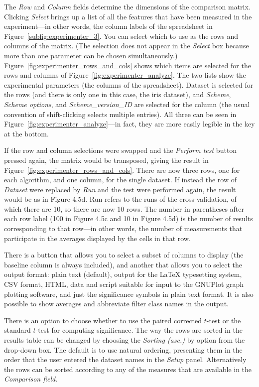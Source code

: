 The \textit{Row} and \textit{Column} fields determine the dimensions
of the comparison matrix. Clicking \textit{Select} brings up a list of
all the features that have been measured in the experiment---in other
words, the column labels of the spreadsheet in
Figure~\ref{subfig:experimenter_3}. You can select which to use as the
rows and columns of the matrix. (The selection does not appear in the
\textit{Select} box because more than one parameter can be chosen
simultaneously.) Figure~\ref{fig:experimenter_rows_and_cols} shows
which items are selected for the rows and columns of
Figure~\ref{fig:experimenter_analyze}. The two lists show the
experimental parameters (the columns of the spreadsheet). Dataset is
selected for the rows (and there is only one in this case, the iris
dataset), and \textit{Scheme}, \textit{Scheme options}, and
\textit{Scheme\_version\_ID} are selected for the column (the usual
convention of shift-clicking selects multiple entries). All three can
be seen in Figure~\ref{fig:experimenter_analyze}---in fact, they are
more easily legible in the key at the bottom.

If the row and column selections were swapped and the \textit{Perform
  test} button pressed again, the matrix would be transposed, giving
the result in Figure~\ref{fig:experimenter_rows_and_cols}. There
are now three rows, one for each algorithm, and one column, for the
single dataset. If instead the row of \textit{Dataset} were replaced
by \textit{Run} and the test were performed again, the result would be
as in Figure 4.5d. Run refers to the runs of the cross-validation, of
which there are 10, so there are now 10 rows. The number in
parentheses after each row label (100 in Figure 4.5c and 10 in Figure
4.5d) is the number of results corresponding to that row---in other
words, the number of measurements that participate in the averages
displayed by the cells in that row.

There is a button that allows you to select a subset of columns to
display (the baseline column is always included), and another that
allows you to select the output format: plain text (default), output
for the LaTeX typesetting system, CSV format, HTML, data and script
suitable for input to the GNUPlot graph plotting software, and just
the significance symbols in plain text format. It is also possible to
show averages and abbreviate filter class names in the output.

There is an option to choose whether to use the paired corrected
$t$-test or the standard $t$-test for computing significance. The way
the rows are sorted in the results table can be changed by choosing
the \textit{Sorting (asc.)} by option from the drop-down box. The
default is to use natural ordering, presenting them in the order that
the user entered the dataset names in the \textit{Setup}
panel. Alternatively the rows can be sorted according to any of the
measures that are available in the \textit{Comparison field}.

